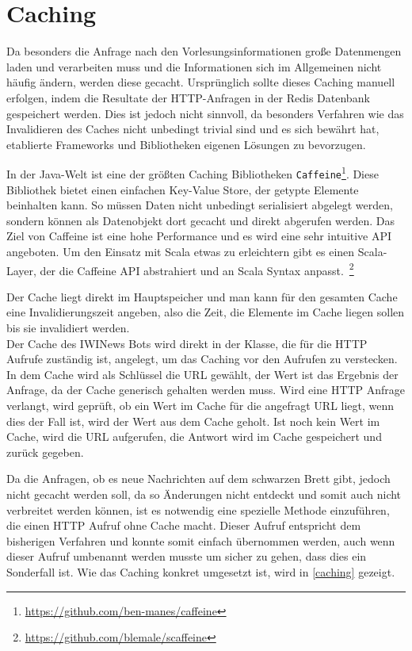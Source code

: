 \section{Caching}
Da besonders die Anfrage nach den Vorlesungsinformationen große Datenmengen laden und verarbeiten muss und die Informationen sich im Allgemeinen nicht häufig ändern, werden diese gecacht. Ursprünglich sollte dieses Caching manuell erfolgen, indem die Resultate der HTTP-Anfragen in der Redis Datenbank gespeichert werden. Dies ist jedoch nicht sinnvoll, da besonders Verfahren wie das Invalidieren des Caches nicht unbedingt trivial sind und es sich bewährt hat, etablierte Frameworks und Bibliotheken eigenen Lösungen zu bevorzugen.

In der Java-Welt ist eine der größten Caching Bibliotheken \texttt{Caffeine}\footnote{\url{https://github.com/ben-manes/caffeine}}. Diese Bibliothek bietet einen einfachen Key-Value Store, der getypte Elemente beinhalten kann. So müssen Daten nicht unbedingt serialisiert abgelegt werden, sondern können als Datenobjekt dort gecacht und direkt abgerufen werden. Das Ziel von Caffeine ist eine hohe Performance und es wird eine sehr intuitive API angeboten. Um den Einsatz mit Scala etwas zu erleichtern gibt es einen Scala-Layer, der die Caffeine API abstrahiert und an Scala Syntax anpasst.~\footnote{\url{https://github.com/blemale/scaffeine}}

Der Cache liegt direkt im Hauptspeicher und man kann für den gesamten Cache eine Invalidierungszeit angeben, also die Zeit, die Elemente im Cache liegen sollen bis sie invalidiert werden.\\
Der Cache des IWINews Bots wird direkt in der Klasse, die für die HTTP Aufrufe zuständig ist, angelegt, um das Caching vor den Aufrufen zu verstecken. In dem Cache wird als Schlüssel die URL gewählt, der Wert ist das Ergebnis der Anfrage, da der Cache generisch gehalten werden muss. Wird eine HTTP Anfrage verlangt, wird geprüft, ob ein Wert im Cache für die angefragt URL liegt, wenn dies der Fall ist, wird der Wert aus dem Cache geholt. Ist noch kein Wert im Cache, wird die URL aufgerufen, die Antwort wird im Cache gespeichert und zurück gegeben.

Da die Anfragen, ob es neue Nachrichten auf dem schwarzen Brett gibt, jedoch nicht gecacht werden soll, da so Änderungen nicht entdeckt und somit auch nicht verbreitet werden können, ist es notwendig eine spezielle Methode einzuführen, die einen HTTP Aufruf ohne Cache macht. Dieser Aufruf entspricht dem bisherigen Verfahren und konnte somit einfach übernommen werden, auch wenn dieser Aufruf umbenannt werden musste um sicher zu gehen, dass dies ein Sonderfall ist. Wie das Caching konkret umgesetzt ist, wird in \autoref{caching} gezeigt.


